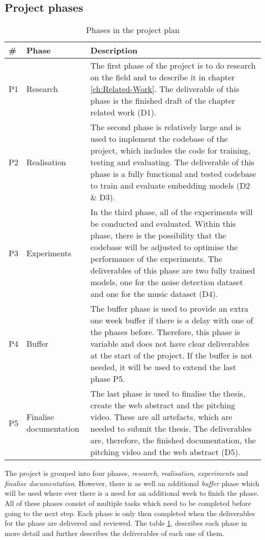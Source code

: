 \subsection{Project phases}
\label{sec:Project-Phases}
\begin{table}[htb]
    \centering
    \caption{Phases in the project plan}
	\label{tab:Phases}
    \begin{tabular}{p{} | p{} | p{}}
        \toprule
        \textbf{\#} & \textbf{Phase} & \textbf{Description} \\ 
        \midrule[1pt]
        P1 & Research & The first phase of the project is to do research on the field and to describe it in chapter \ref{ch:Related-Work}. The deliverable of this phase is the finished draft of the chapter related work (D1). \\
        \hline
        P2 & Realisation & The second phase is relatively large and is used to implement the codebase of the project, which includes the code for training, testing and evaluating. The deliverable of this phase is a fully functional and tested codebase to train and evaluate embedding models (D2 \& D3).\\
        \hline
        P3 & Experiments & In the third phase, all of the experiments will be conducted and evaluated. Within this phase, there is the possibility that the codebase will be adjusted to optimise the performance of the experiments. The deliverables of this phase are two fully trained models, one for the noise detection dataset and one for the music dataset (D4).\\
        \hline
        P4 & Buffer & The buffer phase is used to provide an extra one week buffer if there is a  delay with one of the phases before. Therefore, this phase is variable and does not have clear deliverables at the start of the project. If the buffer is not needed, it will be used to extend the last phase P5. \\
        \hline
        P5 & Finalise documentation & The last phase is used to finalise the thesis, create the web abstract and the pitching video. These are all artefacts, which are needed to submit the thesis. The deliverables are, therefore, the finished documentation, the pitching video and the web abstract (D5). \\
        \bottomrule
    \end{tabular}
\end{table}
\noindent
The project is grouped into four phases, \textit{research}, \textit{realisation}, \textit{experiments} and \textit{finalise documentation}. However, there is as well an additional \textit{buffer} phase which will be used where ever there is a need for an additional week to finish the phase. All of these phases consist of multiple tasks which need to be completed before going to the next step. Each phase is only then completed when the deliverables for the phase are delivered and reviewed. The table \ref{tab:Phases}, describes each phase in more detail and further describes the deliverables of each one of them.

